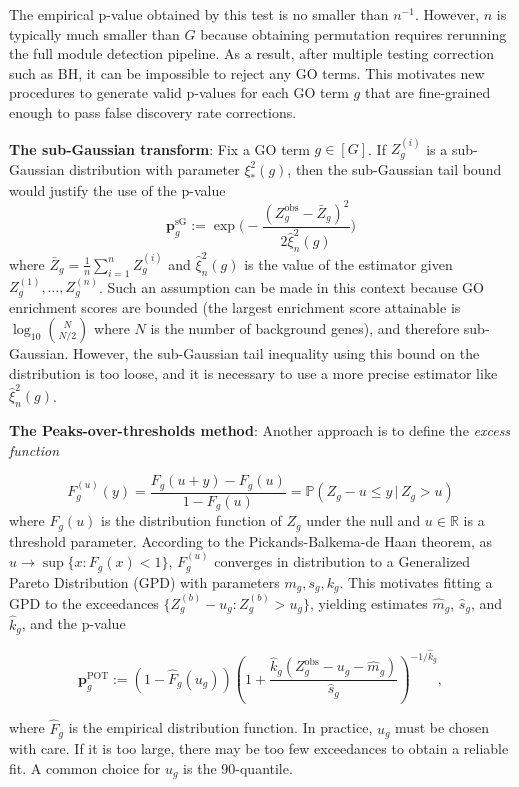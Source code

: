 \documentclass{article}
\theoremstyle{definition}
\newcommand{\R}{\mathbb{R}}
\newcommand{\1}{\mathbbm{1}}
\begin{document}
The empirical p-value obtained by this test is no smaller than $n^{-1}$. However, $n$ is typically much smaller than $G$ because obtaining permutation requires rerunning the full module detection pipeline. As a result, after multiple testing correction such as BH, it can be impossible to reject any GO terms. This motivates new procedures to generate valid p-values for each GO term $g$ that are fine-grained enough to pass false discovery rate corrections. 

\noindent \textbf{The sub-Gaussian transform}: 
Fix a GO term $g \in [G]$. If $Z^{(i)}_g$ is a sub-Gaussian distribution with parameter $\xi_*^2(g)$, then the sub-Gaussian tail bound would justify the use of the p-value 
\[
\mathbf{p}_g^{\text{sG}} := \exp\biggl(-\frac{(Z^{\text{obs}}_g - \bar Z_g)^2}{2\hat \xi^2_{n}(g)}\biggr)
\]
where $\bar Z_g = \frac1n\sum_{i=1}^n Z_g^{(i)}$ and $\hat \xi^2_{n}(g)$ is the value of the estimator given $Z^{(1)}_g,\dots, Z^{(n)}_g$. 
Such an assumption can be made in this context because GO enrichment scores are bounded (the largest enrichment score attainable is $\log_{10}{N \choose N/2}$ where $N$ is the number of background genes), and therefore sub-Gaussian. However, the sub-Gaussian tail inequality using this bound on the distribution is too loose, and it is necessary to use a more precise estimator like $\hat \xi^2_n(g)$.

\noindent \textbf{The Peaks-over-thresholds method}: 
Another approach \citep{@knijnenburg2009fewer} is to define the \textit{excess function}

\[
F_g^{(u)}(y) =  \frac{ F_g(u+y) - F_g(u)}{1 - F_g(u)} = \mathbb P(Z_g - u \le y  \, | \, Z_g > u)
\]
where $F_g(u)$ is the distribution function of $Z_g$ under the null and $u \in \R$ is a threshold parameter. According to the Pickands-Balkema-de Haan theorem, as $u \to \sup \{x: F_g(x) < 1\}$, $F_g^{(u)}$ converges in distribution to a Generalized Pareto Distribution (GPD) with parameters $m_g, s_g, k_g$. This motivates fitting a GPD to the 
exceedances $\{Z^{(b)}_g - u_g : Z^{(b)}_g > u_g\}$, 
yielding estimates $\hat m_g$, $\hat s_g$, and $\hat k_g$, and 
the p-value

\[
\mathbf{p}_g^{\mathrm{POT}} := (1 - \hat F_g(u_g))
\left(1 +  
\frac{\hat k_g(Z^{\text{obs}}_g - u_g - \hat m_g)}{\hat s_g}
\right)^{-1/\hat k_g},
\]


where $\hat F_g$ is the empirical distribution function. In practice, $u_g$ must be chosen with care. If it is too large, there may be too few exceedances to obtain a reliable fit. A common choice for $u_g$ is the 90-quantile.
\end{document}
